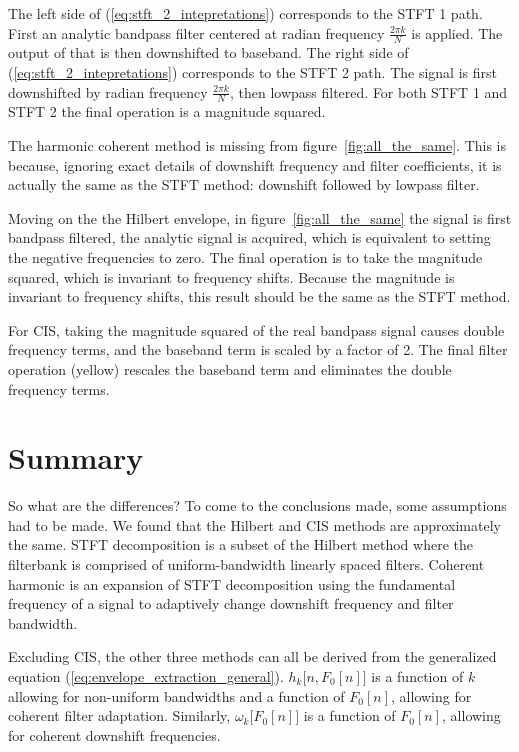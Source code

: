 \documentclass [11pt, proquest,oneside] {ganter_thesis}[2015/03/03]
\begin{document}
The left side of (\ref{eq:stft_2_intepretations}) corresponds to the STFT 1 path.  First an analytic bandpass filter centered at radian frequency $\frac{2\pi k}{N}$ is applied.  The output of that is then downshifted to baseband.  The right side of (\ref{eq:stft_2_intepretations}) corresponds to the STFT 2 path.  The signal is first downshifted by radian frequency $\frac{2\pi k}{N}$, then lowpass filtered.  For both STFT 1 and STFT 2 the final operation is a magnitude squared.

The harmonic coherent method is missing from figure~\ref{fig:all_the_same}.  This is because, ignoring exact details of downshift frequency and filter coefficients, it is actually the same as the STFT method: downshift followed by lowpass filter.

Moving on the the Hilbert envelope, in figure~\ref{fig:all_the_same} the signal is first bandpass filtered, the analytic signal is acquired, which is equivalent to setting the negative frequencies to zero.  The final operation is to take the magnitude squared, which is invariant to frequency shifts.  Because the magnitude is invariant to frequency shifts, this result should be the same as the STFT method.

For CIS, taking the magnitude squared of the real bandpass signal causes double frequency terms, and the baseband term is scaled by a factor of 2.  The final filter operation (yellow) rescales the baseband term and eliminates the double frequency terms.

\section{Summary}

So what are the differences?  To come to the conclusions made, some assumptions had to be made.  We found that the Hilbert and CIS methods are approximately the same.  STFT decomposition is a subset of the Hilbert method where the filterbank is comprised of uniform-bandwidth linearly spaced filters.  Coherent harmonic is an expansion of STFT decomposition using the fundamental frequency of a signal to adaptively change downshift frequency and filter bandwidth.

Excluding CIS, the other three methods can all be derived from the generalized equation (\ref{eq:envelope_extraction_general}).  $h_k\Big[n,F_0[n]\Big]$ is a function of $k$ allowing for non-uniform bandwidths and a function of $F_0[n]$, allowing for coherent filter adaptation.  Similarly, $\omega_k\big[F_0[n]\big]$ is a function of $F_0[n]$, allowing for coherent downshift frequencies.
\end{document}
